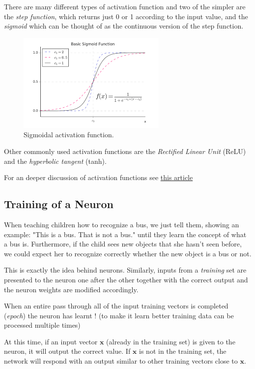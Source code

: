 There are many different types of activation function and two of the simpler are the \emph{step function}, which returns just 0 or 1 according
to the input value, and the \emph{sigmoid} which can be thought
of as the continuous version of the step function.

\begin{figure}[htb]
	\centering
	\includegraphics{figures/sigmoid.png}
	\caption{Sigmoidal activation function.}
\end{figure}

Other commonly used activation functions are the \emph{Rectified Linear Unit}
(ReLU) and the \emph{hyperbolic tangent} (tanh).

For an deeper discussion of activation functions see
\href{https://medium.com/the-theory-of-everything/understanding-activation-functions-in-neural-networks-9491262884e0}{this article}

\subsection{Training of a Neuron}\label{training-of-a-neuron}

When teaching children how to recognize a bus, we just tell them,
showing an example: "This is a bus. That is not a bus." until they
learn the concept of what a bus is. Furthermore, if the child sees new
objects that she hasn't seen before, we could expect her to recognize
correctly whether the new object is a bus or not.

This is exactly the idea behind neurons. Similarly, inputs from a
\emph{training} set are presented to the neuron one after the other
together with the correct output and the neuron weights are modified
accordingly.

When an entire pass through all of the input training vectors is
completed (\emph{epoch}) the neuron has learnt ! (to make it learn better
training data can be processed multiple times)

At this time, if an input vector \(\mathbf{x}\) (already in the training
set) is given to the neuron, it will output the correct value. If
\(\mathbf{x}\) is not in the training set, the network will respond with
an output similar to other training vectors close to \(\mathbf{x}\).

